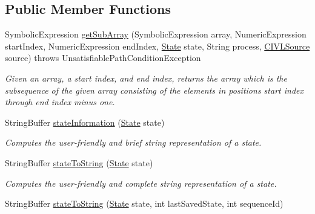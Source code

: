 \subsection*{Public Member Functions}
\begin{DoxyCompactItemize}
\item 
Symbolic\+Expression \hyperlink{interfaceedu_1_1udel_1_1cis_1_1vsl_1_1civl_1_1semantics_1_1IF_1_1SymbolicAnalyzer_ac6aa40c18b6166b74ffc1f83b51f454f}{get\+Sub\+Array} (Symbolic\+Expression array, Numeric\+Expression start\+Index, Numeric\+Expression end\+Index, \hyperlink{interfaceedu_1_1udel_1_1cis_1_1vsl_1_1civl_1_1state_1_1IF_1_1State}{State} state, String process, \hyperlink{interfaceedu_1_1udel_1_1cis_1_1vsl_1_1civl_1_1model_1_1IF_1_1CIVLSource}{C\+I\+V\+L\+Source} source)  throws Unsatisfiable\+Path\+Condition\+Exception
\begin{DoxyCompactList}\small\item\em Given an array, a start index, and end index, returns the array which is the subsequence of the given array consisting of the elements in positions start index through end index minus one. \end{DoxyCompactList}\item 
String\+Buffer \hyperlink{interfaceedu_1_1udel_1_1cis_1_1vsl_1_1civl_1_1semantics_1_1IF_1_1SymbolicAnalyzer_adc04562fe108f600052b507471cd05b6}{state\+Information} (\hyperlink{interfaceedu_1_1udel_1_1cis_1_1vsl_1_1civl_1_1state_1_1IF_1_1State}{State} state)
\begin{DoxyCompactList}\small\item\em Computes the user-\/friendly and brief string representation of a state. \end{DoxyCompactList}\item 
String\+Buffer \hyperlink{interfaceedu_1_1udel_1_1cis_1_1vsl_1_1civl_1_1semantics_1_1IF_1_1SymbolicAnalyzer_ae2b4298ca01764e97ed22611afb3359c}{state\+To\+String} (\hyperlink{interfaceedu_1_1udel_1_1cis_1_1vsl_1_1civl_1_1state_1_1IF_1_1State}{State} state)
\begin{DoxyCompactList}\small\item\em Computes the user-\/friendly and complete string representation of a state. \end{DoxyCompactList}\item 
String\+Buffer \hyperlink{interfaceedu_1_1udel_1_1cis_1_1vsl_1_1civl_1_1semantics_1_1IF_1_1SymbolicAnalyzer_ac98060c832c84748ae46e82069c83278}{state\+To\+String} (\hyperlink{interfaceedu_1_1udel_1_1cis_1_1vsl_1_1civl_1_1state_1_1IF_1_1State}{State} state, int last\+Saved\+State, int sequence\+Id)

\end{DoxyCompactItemize}
